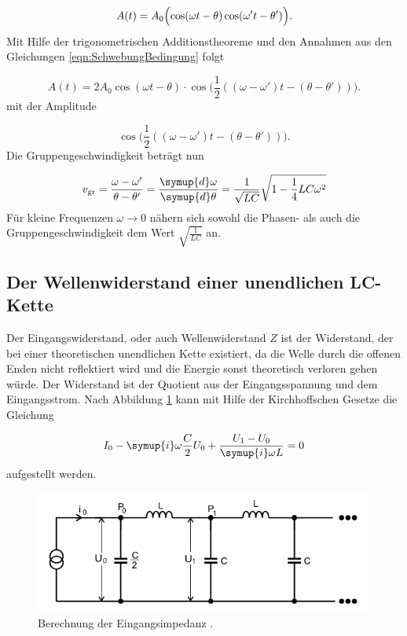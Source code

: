 \begin{equation}
  A(t) = A_0 \Bigl(\cos(\omega t - \theta) \cos(\omega' t - \theta')\Bigr).
\end{equation}
Mit Hilfe der trigonometrischen Additionstheoreme und den Annahmen aus den
Gleichungen \eqref{eqn:SchwebungBedingung} folgt

\begin{equation}
  A(t) = 2 A_0 \cos(\omega t - \theta) \cdot \cos \Bigr(\frac{1}{2}
  ((\omega-\omega')t-(\theta-\theta'))\Bigr).
\end{equation}
mit der Amplitude

\begin{equation}
  \cos \Bigr(\frac{1}{2}
  ((\omega-\omega')t-(\theta-\theta'))\Bigr).
\end{equation}
Die Gruppengeschwindigkeit beträgt nun

\begin{equation}
  v_\text{gr} = \frac{\omega - \omega'}{\theta - \theta'} =
  \frac{\symup{d}\omega}{\symup{d}\theta} =
  \frac{1}{\sqrt{LC}}\sqrt{1 - \frac{1}{4}LC\omega^2}
\end{equation}
Für kleine Frequenzen $\omega \to 0$ nähern sich sowohl die Phasen- als auch
die Gruppengeschwindigkeit dem Wert $\sqrt{\frac{1}{LC}}$ an.


\subsection{Der Wellenwiderstand einer unendlichen LC-Kette}

Der Eingangswiderstand, oder auch Wellenwiderstand $Z$ ist der Widerstand, der
bei einer theoretischen unendlichen Kette existiert, da die Welle durch die
offenen Enden nicht reflektiert wird und die Energie sonst theoretisch
verloren gehen würde.
Der Widerstand ist der Quotient aus der Eingangsspannung und dem Eingangsstrom.
Nach Abbildung \ref{fig:WW} kann mit Hilfe der Kirchhoffschen Gesetze die
Gleichung

\begin{equation}
  I_0 - \symup{i}\omega \frac{C}{2} U_0 + \frac{U_1 - U_0}{\symup{i}\omega L}=0
  \label{eqn:Eingang}
\end{equation}
aufgestellt werden.

\newpage

\begin{figure}
  \centering
  \includegraphics[height = 4cm]{Wellenwiderstand.png}
  \caption{Berechnung der Eingangsimpedanz \cite{anleitung}.}
  \label{fig:WW}
\end{figure}

